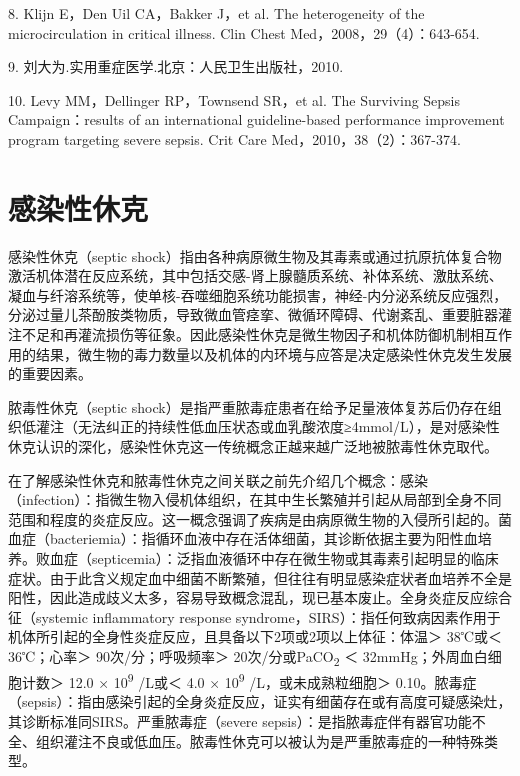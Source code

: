 8. Klijn E，Den Uil CA，Bakker J，et al. The heterogeneity of the
microcirculation in critical illness. Clin Chest
Med，2008，29（4）：643-654.

9. 刘大为.实用重症医学.北京：人民卫生出版社，2010.

10. Levy MM，Dellinger RP，Townsend SR，et al. The Surviving Sepsis
Campaign：results of an international guideline-based performance
improvement program targeting severe sepsis. Crit Care
Med，2010，38（2）：367-374.

\protect\hypertarget{text00057.html}{}{}

\chapter{感染性休克}

感染性休克（septic
shock）指由各种病原微生物及其毒素或通过抗原抗体复合物激活机体潜在反应系统，其中包括交感-肾上腺髓质系统、补体系统、激肽系统、凝血与纤溶系统等，使单核-吞噬细胞系统功能损害，神经-内分泌系统反应强烈，分泌过量儿茶酚胺类物质，导致微血管痉挛、微循环障碍、代谢紊乱、重要脏器灌注不足和再灌流损伤等征象。因此感染性休克是微生物因子和机体防御机制相互作用的结果，微生物的毒力数量以及机体的内环境与应答是决定感染性休克发生发展的重要因素。

脓毒性休克（septic
shock）是指严重脓毒症患者在给予足量液体复苏后仍存在组织低灌注（无法纠正的持续性低血压状态或血乳酸浓度≥4mmol/L），是对感染性休克认识的深化，感染性休克这一传统概念正越来越广泛地被脓毒性休克取代。

在了解感染性休克和脓毒性休克之间关联之前先介绍几个概念：感染（infection）：指微生物入侵机体组织，在其中生长繁殖并引起从局部到全身不同范围和程度的炎症反应。这一概念强调了疾病是由病原微生物的入侵所引起的。菌血症（bacteriemia）：指循环血液中存在活体细菌，其诊断依据主要为阳性血培养。败血症（septicemia）：泛指血液循环中存在微生物或其毒素引起明显的临床症状。由于此含义规定血中细菌不断繁殖，但往往有明显感染症状者血培养不全是阳性，因此造成歧义太多，容易导致概念混乱，现已基本废止。全身炎症反应综合征（systemic
inflammatory response
syndrome，SIRS）：指任何致病因素作用于机体所引起的全身性炎症反应，且具备以下2项或2项以上体征：体温＞
38℃或＜ 36℃；心率＞ 90次/分；呼吸频率＞ 20次/分或PaCO\textsubscript{2}
＜ 32mmHg；外周血白细胞计数＞ 12.0 × 10\textsuperscript{9} /L或＜ 4.0 ×
10\textsuperscript{9} /L，或未成熟粒细胞＞
0.10。脓毒症（sepsis）：指由感染引起的全身炎症反应，证实有细菌存在或有高度可疑感染灶，其诊断标准同SIRS。严重脓毒症（severe
sepsis）：是指脓毒症伴有器官功能不全、组织灌注不良或低血压。脓毒性休克可以被认为是严重脓毒症的一种特殊类型。

